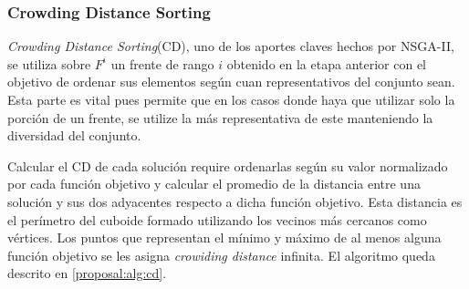 

\subsubsection{Crowding Distance Sorting}
\textit{Crowding Distance Sorting}(CD), uno de los aportes claves hechos por NSGA-II, se utiliza sobre  $F^i$ un frente de rango $i$ obtenido en la etapa anterior con el objetivo de ordenar sus elementos seg\'un cuan representativos del conjunto sean. Esta parte es vital pues permite que en los casos donde haya que utilizar solo la porci\'on de un frente, se utilize la m\'as representativa de este manteniendo la diversidad del conjunto.

Calcular el CD de cada soluci\'on require ordenarlas seg\'un su valor normalizado por cada funci\'on objetivo y calcular el promedio de la distancia entre una soluci\'on y sus dos adyacentes respecto a dicha funci\'on objetivo. Esta distancia es el per\'imetro del cuboide formado utilizando los vecinos m\'as cercanos como v\'ertices. Los puntos que representan el m\'inimo y m\'aximo de al menos alguna funci\'on objetivo se les asigna \textit{crowiding distance} infinita. El  algoritmo queda descrito en \ref{proposal:alg:cd}.

